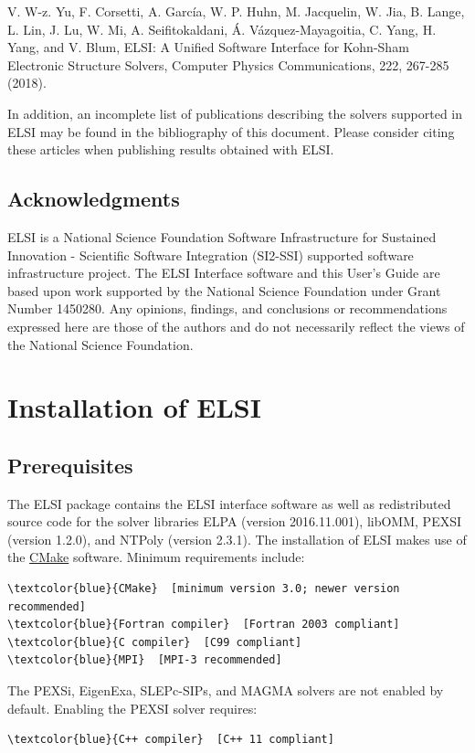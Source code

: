 \documentclass{report}
\begin{document}
V. W-z. Yu, F. Corsetti, A. Garc\'{i}a, W. P. Huhn, M. Jacquelin, W. Jia, B. Lange, L. Lin, J. Lu, W. Mi, A. Seifitokaldani, \'{A}. V\'{a}zquez-Mayagoitia, C. Yang, H. Yang, and V. Blum, ELSI: A Unified Software Interface for Kohn-Sham Electronic Structure Solvers, Computer Physics Communications, 222, 267-285 (2018).

In addition, an incomplete list of publications describing the solvers supported in ELSI may be found in the bibliography of this document. Please consider citing these articles when publishing results obtained with ELSI.

\section{Acknowledgments}
\label{sec:thanks}
ELSI is a National Science Foundation Software Infrastructure for Sustained Innovation - Scientific Software Integration (SI2-SSI) supported software infrastructure project. The ELSI Interface software and this User's Guide are based upon work supported by the National Science Foundation under Grant Number 1450280. Any opinions, findings, and conclusions or recommendations expressed here are those of the authors and do not necessarily reflect the views of the National Science Foundation.

\chapter{Installation of ELSI}
\section{Prerequisites}
\label{sec:prereq}
The ELSI package contains the ELSI interface software as well as redistributed source code for the solver libraries ELPA (version 2016.11.001), libOMM, PEXSI (version 1.2.0), and NTPoly (version 2.3.1). The installation of ELSI makes use of the \href{http://cmake.org}{CMake} software. Minimum requirements include:
\begin{Verbatim}[commandchars=\\\{\}]
\textcolor{blue}{CMake}  [minimum version 3.0; newer version recommended]
\textcolor{blue}{Fortran compiler}  [Fortran 2003 compliant]
\textcolor{blue}{C compiler}  [C99 compliant]
\textcolor{blue}{MPI}  [MPI-3 recommended]
\end{Verbatim}

The PEXSi, EigenExa, SLEPc-SIPs, and MAGMA solvers are not enabled by default. Enabling the PEXSI solver requires:
\begin{Verbatim}[commandchars=\\\{\}]
\textcolor{blue}{C++ compiler}  [C++ 11 compliant]
\end{Verbatim}
\end{document}
